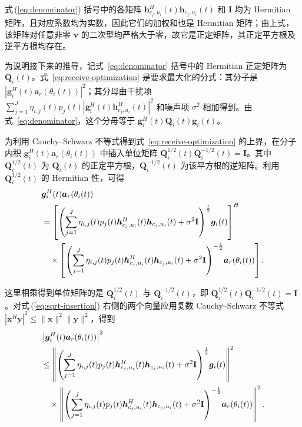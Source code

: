 \documentclass[11pt,a4paper]{ctexart}
\begin{document}
\begin{samepage}
式\,(\ref{eq:denominator}) 括号中的各矩阵 $\bm h_{c_j,u_i}^{H}(t)\bm h_{c_j,u_i}(t)$ 和 $\mathbf I$ 均为 Hermitian 矩阵，且对应系数均为实数，因此它们的加权和也是 Hermitian 矩阵；由上式，该矩阵对任意非零 $\bm v$ 的二次型均严格大于零，故它是正定矩阵，其正定平方根及逆平方根均存在。

为说明接下来的推导，记式~\eqref{eq:denominator} 括号中的 Hermitian 正定矩阵为 $\mathbf Q_i(t)$。式~\eqref{eq:receive-optimization} 是要求最大化的分式：其分子是 $|\bm g_i^H(t)\bm a_r(\theta_i(t))|^2$；其分母由干扰项 $\sum_{j=1}^{J}\eta_{i,j}(t)p_j(t)|\bm g_i^H(t)\bm h_{c_j,u_i}^{H}(t)|^2$ 和噪声项 $\sigma^2$ 相加得到。由式~\eqref{eq:denominator}，这个分母等于 $\bm g_i^H(t)\mathbf Q_i(t)\bm g_i(t)$。

为利用 Cauchy--Schwarz 不等式得到式~\eqref{eq:receive-optimization} 的上界，在分子内积 $\bm g_i^H(t)\bm a_r(\theta_i(t))$ 中插入单位矩阵 $\mathbf Q_i^{1/2}(t)\mathbf Q_i^{-1/2}(t)=\mathbf I$。其中 $\mathbf Q_i^{1/2}(t)$ 为 $\mathbf Q_i(t)$ 的正定平方根，$\mathbf Q_i^{-1/2}(t)$ 为该平方根的逆矩阵。利用 $\mathbf Q_i^{1/2}(t)$ 的 Hermitian 性，可得
\begin{align}\label{eq:sqrt-insertion}
&\bm g_i^H(t)\bm a_r(\theta_i(t))\notag\\
&=\left[\left(\sum_{j=1}^J\eta_{i,j}(t)p_j(t)
\bm h_{c_j,u_i}^{H}(t)\bm h_{c_j,u_i}(t)+\sigma^2\mathbf I\right)^{\frac12}\!\bm g_i(t)\right]^H\notag\\
&\quad\times\left[\left(\sum_{j=1}^J\eta_{i,j}(t)p_j(t)
\bm h_{c_j,u_i}^{H}(t)\bm h_{c_j,u_i}(t)+\sigma^2\mathbf I\right)^{-\frac12}\!\bm a_r(\theta_i(t))\right].
\end{align}
\end{samepage}
\begin{samepage}
这里相乘得到单位矩阵的是 $\mathbf Q_i^{1/2}(t)$ 与 $\mathbf Q_i^{-1/2}(t)$，即 $\mathbf Q_i^{1/2}(t)\mathbf Q_i^{-1/2}(t)=\mathbf I$。对式\,(\ref{eq:sqrt-insertion}) 右侧的两个向量应用复数 Cauchy--Schwarz 不等式 $|\bm x^H\bm y|^2\le\|\bm x\|^2\|\bm y\|^2$，得到
\begin{align}\label{eq:cs-norms}
&\left|\bm g_i^H(t)\bm a_r(\theta_i(t))\right|^2\notag\\
&\le\left\|\left(\sum_{j=1}^J\eta_{i,j}(t)p_j(t)
\bm h_{c_j,u_i}^{H}(t)\bm h_{c_j,u_i}(t)+\sigma^2\mathbf I\right)^{\frac12}\!\bm g_i(t)\right\|^2\notag\\
&\quad\times\left\|\left(\sum_{j=1}^J\eta_{i,j}(t)p_j(t)
\bm h_{c_j,u_i}^{H}(t)\bm h_{c_j,u_i}(t)+\sigma^2\mathbf I\right)^{-\frac12}\!\bm a_r(\theta_i(t))\right\|^2.
\end{align}
\end{samepage}
\end{document}

